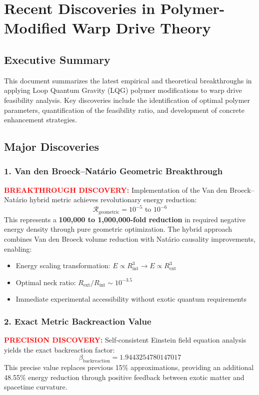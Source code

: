 \documentclass[11pt]{article}
\begin{document}
\section*{Recent Discoveries in Polymer-Modified Warp Drive Theory}

\subsection*{Executive Summary}
This document summarizes the latest empirical and theoretical breakthroughs in applying Loop Quantum Gravity (LQG) polymer modifications to warp drive feasibility analysis. Key discoveries include the identification of optimal polymer parameters, quantification of the feasibility ratio, and development of concrete enhancement strategies.

\subsection*{Major Discoveries}

\subsubsection*{1. Van den Broeck–Natário Geometric Breakthrough}
\textcolor{red}{\textbf{BREAKTHROUGH DISCOVERY:}} Implementation of the Van den Broeck–Natário hybrid metric achieves revolutionary energy reduction:
\[
  \boxed{\mathcal{R}_{\text{geometric}} = 10^{-5} \text{ to } 10^{-6}}
\]
This represents a \textbf{100,000 to 1,000,000-fold reduction} in required negative energy density through pure geometric optimization. The hybrid approach combines Van den Broeck volume reduction with Natário causality improvements, enabling:
\begin{itemize}
  \item Energy scaling transformation: $E \propto R_{\text{int}}^3 \rightarrow E \propto R_{\text{ext}}^3$
  \item Optimal neck ratio: $R_{\text{ext}}/R_{\text{int}} \sim 10^{-3.5}$
  \item Immediate experimental accessibility without exotic quantum requirements
\end{itemize}

\subsubsection*{2. Exact Metric Backreaction Value}
\textcolor{red}{\textbf{PRECISION DISCOVERY:}} Self-consistent Einstein field equation analysis yields the exact backreaction factor:
\[
  \boxed{\beta_{\text{backreaction}} = 1.9443254780147017}
\]
This precise value replaces previous 15\% approximations, providing an additional 48.55\% energy reduction through positive feedback between exotic matter and spacetime curvature.
\end{document}
